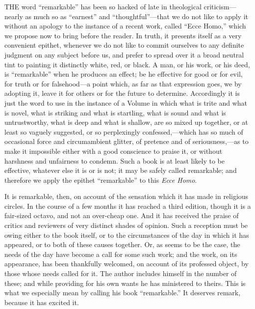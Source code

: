 
THE
word ``remarkable'' has been so hacked of late in theological
criticism—nearly as much so as ``earnest'' and ``thoughtful''—that
we do not like to apply it without an apology to the instance of a
recent work, called ``Ecce Homo,'' which we propose now to bring before
the reader. In truth, it presents itself as a very convenient epithet,
whenever we do not like to commit ourselves to any definite judgment
on any subject before us, and prefer to spread over it a broad neutral
tint to painting it distinctly white, red, or black. A man, or his
work, or his deed, is ``remarkable'' when he produces an effect; be he
effective for good or for evil, for truth or for falsehood—a point
which, as far as that expression goes, we by adopting it, leave it for
others or for the future to determine. Accordingly it is just the word
to use in the instance of a Volume in which what is trite and what is
novel, what is striking and what is startling, what is sound and what
is untrustworthy, what is deep and what is shallow, are so mixed up
together, or at least so vaguely suggested, or so perplexingly
confessed,—which has so much of occasional force and circumambient
glitter, of pretence and of seriousness,—as to make it impossible
either with a good conscience to praise it, or without harshness and
unfairness to condemn. Such a book is at least likely to be effective,
whatever else it is or is not; it may be safely called
remarkable; and therefore we apply the epithet ``remarkable''
to this \emph{Ecce Homo}.

It is remarkable, then, on account of the
sensation which it has made in religious circles. In the course of a
few months it has reached a third edition, though it is a fair-sized
octavo, and not an over-cheap one. And it has received the praise of
critics and reviewers of very distinct shades of opinion. Such a
reception must be owing either to the book itself, or to the
circumstances of the day in which it has appeared, or to both of these
causes together. Or, as seems to be the case, the needs of the day
have become a call for some such work; and the work, on its
appearance, has been thankfully welcomed, on account of its professed
object, by those whose needs called for it. The author includes
himself in the number of these; and while providing for his own wants
he has ministered to theirs. This is what we especially mean by
calling his book ``remarkable.'' It deserves remark, because it has
excited it.

